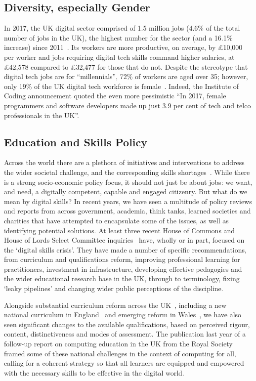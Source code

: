 \documentclass[sigconf,anonymous]{acmart}
\begin{document}
\subsection{Diversity, especially Gender}\label{sec:Gender}

In 2017, the UK digital sector comprised of 1.5 million jobs (4.6\% of
the total number of jobs in the UK), the highest number for the sector
(and a 16.1\% increase) since 2011~\cite{dcms:2017}. Its workers are
more productive, on average, by \pounds10,000 per worker and jobs
requiring digital tech skills command higher salaries, at
\pounds42,578 compared to \pounds32,477 for those that do not. Despite
the stereotype that digital tech jobs are for ``millennials'', 72\% of
workers are aged over 35; however, only 19\% of the UK digital tech
workforce is female~\cite{technation:2018}. Indeed, the Institute of
Coding announcement \cite{DfE2018a} quoted the even more pessimistic
``In 2017, female programmers and software developers made up just 3.9
per cent of tech and telco professionals in the UK''.

\subsection{Education and Skills Policy}

Across the world there are a plethora of initiatives and interventions
to address the wider societal challenge, and the corresponding skills
shortages~\cite{cece:2017}. While there is a strong socio-economic
policy focus, it should not just be about jobs: we want, and need, a
digitally competent, capable and engaged citizenry. But what do we
mean by digital skills? In recent years, we have seen a multitude of
policy reviews and reports from across government, academia, think
tanks, learned societies and charities that have attempted to
encapsulate some of the issues, as well as identifying potential
solutions. At least three recent House of Commons and House of Lords
Select Committee
inquiries~\cite{ukholds:2015,ukhocst:2016,ukholc:2017} have, wholly or
in part, focused on the `digital skills crisis'. They have made a
number of specific recommendations, from curriculum and qualifications
reform, improving professional learning for practitioners, investment
in infrastructure, developing effective pedagogies and the wider
educational research base in the UK, through to terminology, fixing
`leaky pipelines' and changing wider public perceptions of the
discipline.

Alongside substantial curriculum reform across the
UK~\cite{crick+sentance:2011,brown-et-al:sigcse2013,brown-et-al:toce2014},
including a new national curriculum in England~\cite{DfE2013a} and
emerging reform in
Wales~\cite{wgictreview:2013,crick+moller:wipsce2015,moller+crick:jce2018},
we have also seen significant changes to the available qualifications,
based on perceived rigour, content, distinctiveness and modes of
assessment. The publication last year of a follow-up report on
computing education in the UK from the Royal Society~\cite{rs:2017}
framed some of these national challenges in the context of computing
for all, calling for a coherent strategy so that all learners are
equipped and empowered with the necessary skills to be effective in
the digital world.
\end{document}
